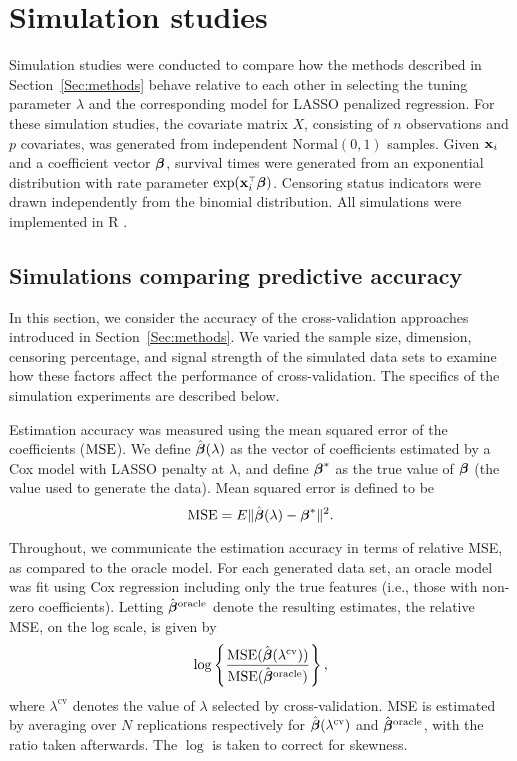 \section{Simulation studies}

Simulation studies were conducted to compare how the methods described in Section~\ref{Sec:methods} behave relative to each other in selecting the tuning parameter $\lambda$ and the corresponding model for LASSO penalized regression. For these simulation studies, the covariate matrix $X$, consisting of $n$ observations and $p$ covariates, was generated from independent $\text{Normal}(0, 1)$ samples. Given $\mathbf{x}_i$ and a coefficient vector $\boldsymbol{\beta}$, survival times were generated from an exponential distribution with rate parameter $\exp(\mathbf{x}_i ^{\scriptscriptstyle\top} \boldsymbol{\beta})$. Censoring status indicators were drawn independently from the binomial distribution. All simulations were implemented in R \citep{R}. 
   
\subsection{Simulations comparing predictive accuracy}
\label{Sec:accuracy}

In this section, we consider the accuracy of the cross-validation approaches introduced in Section~\ref{Sec:methods}. We varied the sample size, dimension, censoring percentage, and signal strength of the simulated data sets to examine how these factors affect the performance of cross-validation. The specifics of the simulation experiments are described below.

Estimation accuracy was measured using the mean squared error of the coefficients ($\textrm{MSE}$). We define $\bbh(\lambda)$ as the vector of coefficients estimated by a Cox model with LASSO penalty at $\lambda$, and define $\boldsymbol{\beta}^*$ as the true value of $\boldsymbol{\beta}$ (the value used to generate the data). Mean squared error is defined to be 
\begin{equation}
\MSE = E\| \bbh(\lambda) - \bbeta^* \| ^2.
\end{equation}

Throughout, we communicate the estimation accuracy in terms of relative MSE, as compared to the oracle
model.  For each generated data set, an oracle model was fit using Cox regression including only the true features (i.e., those with non-zero coefficients). Letting $\bbh^{\text{oracle}}$ denote the resulting estimates, the relative MSE, on the log scale, is given by
\begin{equation}
\log\left\{ \frac{\MSE(\bbh(\lambda^{\text{cv}}))}{\MSE(\bbh^{\text{oracle}})} \right\},
\end{equation}
where $\lambda^{\text{cv}}$ denotes the value of $\lambda$ selected by cross-validation. MSE is estimated by averaging over $N$ replications respectively for $\bbh(\lambda^{\text{cv}})$ and $\bbh^{\text{oracle}}$, with the ratio taken afterwards. The $\log$ is taken to correct for skewness.

